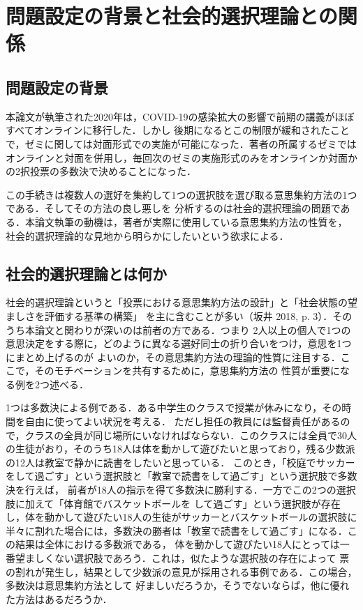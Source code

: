 \documentclass[dvipdfmx]{jsarticle}
\begin{document}
\section{問題設定の背景と社会的選択理論との関係}
\subsection{問題設定の背景}
本論文が執筆された2020年は，COVID-19の感染拡大の影響で前期の講義がほぼすべてオンラインに移行した．しかし
後期になるとこの制限が緩和されたことで，ゼミに関しては対面形式での実施が可能になった．著者の所属するゼミでは
オンラインと対面を併用し，毎回次のゼミの実施形式のみをオンラインか対面かの2択投票の多数決で決めることになった．

この手続きは複数人の選好を集約して1つの選択肢を選び取る意思集約方法の1つである．そしてその方法の良し悪しを
分析するのは社会的選択理論の問題である．本論文執筆の動機は，著者が実際に使用している意思集約方法の性質を，
社会的選択理論的な見地から明らかにしたいという欲求による．

\subsection{社会的選択理論とは何か}\label{社会的選択とは何か}
社会的選択理論というと「投票における意思集約方法の設計」と「社会状態の望ましさを評価する基準の構築」
を主に含むことが多い（坂井 2018, p. 3）．そのうち本論文と関わりが深いのは前者の方である．つまり
2人以上の個人で1つの意思決定をする際に，どのように異なる選好同士の折り合いをつけ，意思を1つにまとめ上げるのが
よいのか，その意思集約方法の理論的性質に注目する．ここで，そのモチベーションを共有するために，意思集約方法の
性質が重要になる例を2つ述べる．

1つは多数決による例である．ある中学生のクラスで授業が休みになり，その時間を自由に使ってよい状況を考える．
ただし担任の教員には監督責任があるので，クラスの全員が同じ場所にいなければならない．このクラスには全員で30人
の生徒がおり，そのうち18人は体を動かして遊びたいと思っており，残る少数派の12人は教室で静かに読書をしたいと思っている．
このとき，「校庭でサッカーをして過ごす」という選択肢と「教室で読書をして過ごす」という選択肢で多数決を行えば，
前者が18人の指示を得て多数決に勝利する．一方でこの2つの選択肢に加えて「体育館でバスケットボールを
して過ごす」という選択肢が存在し，体を動かして遊びたい18人の生徒がサッカーとバスケットボールの選択肢に
半々に割れた場合には，多数決の勝者は「教室で読書をして過ごす」になる．この結果は全体における多数派である，
体を動かして遊びたい18人にとっては一番望ましくない選択肢であろう．これは，似たような選択肢の存在によって
票の割れが発生し，結果として少数派の意見が採用される事例である．この場合，多数決は意思集約方法として
好ましいだろうか，そうでないならば，他に優れた方法はあるだろうか．
\end{document}
